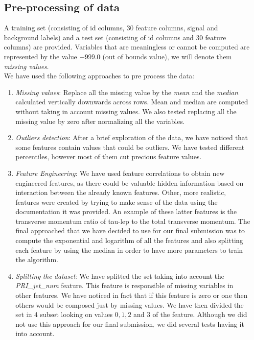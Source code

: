 \documentclass[10pt,conference,compsocconf]{IEEEtran}
\begin{document}
\subsection{Pre-processing of data} \label{sec:models}
A training set (consisting of id columns, 30 feature columns, signal and background labels) and a test set (consisting of id columns and 30 feature columns) are provided.  
Variables that are meaningless or cannot be computed are represented by the value $−999.0$ (out of bounds value), we will denote them \textit{missing values}. \\
We have used the following approaches to pre process the data:
\begin{enumerate}
    \item  \textit{Missing values}: Replace all the missing value by the \textit{mean} and the \textit{median} calculated vertically downwards across rows. Mean and median are computed without taking in account missing values. We also tested replacing all the missing value by zero after normalizing all the variables.
    \item \textit{Outliers detection}: After a brief exploration of the data, we have noticed that some features contain values that could be outliers. We have tested different percentiles, however most of them cut precious feature values. 
    \item \textit{Feature Engineering}: We have used feature correlations to obtain new engineered features, as there could be valuable hidden information based on interaction between the already known features. Other, more realistic, features were created by trying to make sense of the data using the documentation it was provided. An example of these latter features is the transverse momentum ratio of tau-lep to the total transverse momentum. The final approached that we have decided to use for our final submission was to compute the exponential and logarithm of all the features and also splitting each feature by using the median in order to have more parameters to train the algorithm.
    \item \textit{Splitting the dataset}: We have splitted the set taking into account the \textit{PRI\_jet\_num} feature. This feature is responsible of missing variables in other features. We have noticed in fact that if this feature is zero or one then others would be composed just by missing values. We have then divided the set in 4 subset looking on values $0, 1, 2$ and $3$ of the feature. Although we did not use this approach for our final submission, we did several tests having it into account. 

\end{enumerate}
\end{document}
